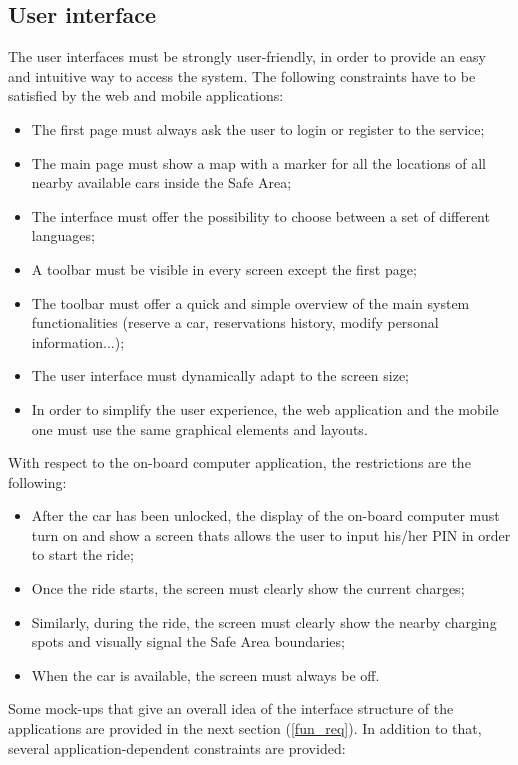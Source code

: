 \subsection{User interface}
The user interfaces must be strongly user-friendly, in order to provide an easy and intuitive way to access the system. The following constraints have to be satisfied by the web and mobile applications:
\begin{itemize}
\item The first page must always ask the user to login or register to the service;
\item The main page must show a map with a marker for all the locations of all nearby available cars inside the Safe Area;
\item The interface must offer the possibility to choose between a set of different languages;
\item A toolbar must be visible in every screen except the first page;
\item The toolbar must offer a quick and simple overview of the main system functionalities (reserve a car, reservations history, modify personal information...);
\item The user interface must dynamically adapt to the screen size;
\item In order to simplify the user experience, the web application and the mobile one must use the same graphical elements and layouts.
\end{itemize}
With respect to the on-board computer application, the restrictions are the following:
\begin{itemize}
\item After the car has been unlocked, the display of the on-board computer must turn on and show a screen thats allows the user to input his/her PIN in order to start the ride;
\item Once the ride starts, the screen must clearly show the current charges;
\item Similarly, during the ride, the screen must clearly show the nearby charging spots and visually signal the Safe Area boundaries;
\item When the car is available, the screen must always be off.
\end{itemize}
Some mock-ups that give an overall idea of the interface structure of the applications are provided in the next section (\ref{fun_req}).
In addition to that, several application-dependent constraints are provided:
